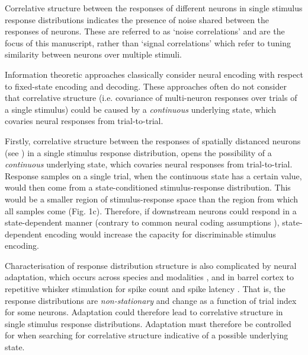 \documentclass{article}
\begin{document}
Correlative structure between the responses of different neurons in single stimulus response distributions indicates the presence of noise shared between the responses of neurons. These are referred to as `noise correlations' and are the focus of this manuscript, rather than `signal correlations' which refer to tuning similarity between neurons over multiple stimuli. 

Information theoretic approaches classically consider neural encoding with respect to fixed-state encoding and decoding. These approaches often do not consider that correlative structure (i.e. covariance of multi-neuron responses over trials of a single stimulus) could be caused by a \textit{continuous} underlying state, which covaries neural responses from trial-to-trial.



Firstly, correlative structure between the responses of spatially distanced neurons (see \cite{reid2012functional, feldmeyer2013barrel}) in a single stimulus response distribution, opens the possibility of a \textit{continuous} underlying state, which covaries neural responses from trial-to-trial. Response samples on a single trial, when the continuous state has a certain value, would then come from a state-conditioned stimulus-response distribution. This would be a smaller region of stimulus-response space than the region from which all samples come (Fig. 1c). Therefore, if downstream neurons could respond in a state-dependent manner (contrary to common neural coding assumptions \cite{moreno2014information, stringer2019high}), state-dependent encoding would increase the capacity for discriminable stimulus encoding.

Characterisation of response distribution structure is also complicated by neural adaptation, which occurs across species and modalities \cite{dragoi2002dynamics, ulanovsky2003processing, sharpee2006adaptive}, and in barrel cortex to repetitive whisker stimulation for spike count \cite{ahissar2000transformation, ahissar2001temporal, kheradpezhouh2017response, khatri2009stimulus, martin2014tactile, barros2019response} and spike latency \cite{ahissar2000transformation, ahissar2001temporal, kheradpezhouh2017response}. That is, the response distributions are \textit{non-stationary} and change as a function of trial index for some neurons. Adaptation could therefore lead to correlative structure in single stimulus response distributions. Adaptation must therefore be controlled for when searching for correlative structure indicative of a possible underlying state.
\end{document}
